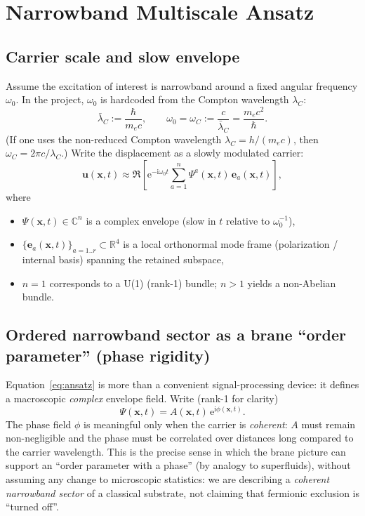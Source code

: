 \documentclass[11pt,a4paper]{article}
\newcommand{\R}{\mathbb{R}}
\newcommand{\C}{\mathbb{C}}
\providecommand{\ii}{\mathrm{i}}
\providecommand{\e}{\mathrm{e}}
\newcommand{\x}{\mathbf{x}}                 %
\newcommand{\uvec}{\mathbf{u}}              %
\begin{document}
\section{Narrowband Multiscale Ansatz}
\label{sec:multiscale}

\subsection{Carrier scale and slow envelope}
Assume the excitation of interest is narrowband around a fixed angular frequency
\(\omega_0\). In the project, \(\omega_0\) is hardcoded from the Compton wavelength
\(\lambda_C\):
\[
\bar\lambda_C := \frac{\hbar}{m_e c},\qquad \omega_0=\omega_C:=\frac{c}{\bar\lambda_C}=\frac{m_e c^2}{\hbar}.
\]
(If one uses the non-reduced Compton wavelength \(\lambda_C=h/(m_e c)\), then \(\omega_C=2\pi c/\lambda_C\).)
Write the displacement as a slowly modulated carrier:
\begin{equation}
\uvec(\x,t)
\approx
\Re\!\left[
\e^{-\ii \omega_0 t}\sum_{a=1}^{n} \Psi^a(\x,t)\, \mathbf{e}_a(\x,t)
\right],
\label{eq:ansatz}
\end{equation}
where
\begin{itemize}
  \item \(\Psi(\x,t)\in\C^{n}\) is a complex envelope (slow in \(t\) relative to \(\omega_0^{-1}\)),
  \item \(\{\mathbf{e}_a(\x,t)\}_{a=1..r}\subset\R^4\) is a local orthonormal mode frame
        (polarization / internal basis) spanning the retained subspace,
  \item \(n=1\) corresponds to a U(1) (rank-1) bundle; \(n>1\) yields a non-Abelian bundle.
\end{itemize}


\subsection{Ordered narrowband sector as a brane ``order parameter'' (phase rigidity)}
\label{subsec:order_parameter}

Equation~\eqref{eq:ansatz} is more than a convenient signal-processing device: it defines a macroscopic \emph{complex}
envelope field. Write (rank-1 for clarity)
\[
\Psi(\x,t)=A(\x,t)\,\e^{\ii\phi(\x,t)}.
\]
The phase field $\phi$ is meaningful only when the carrier is \emph{coherent}: $A$ must remain non-negligible and the
phase must be correlated over distances long compared to the carrier wavelength. This is the precise sense in which the
brane picture can support an ``order parameter with a phase'' (by analogy to superfluids), without assuming any change
to microscopic statistics: we are describing a \emph{coherent narrowband sector} of a classical substrate, not claiming
that fermionic exclusion is ``turned off''.
\end{document}
